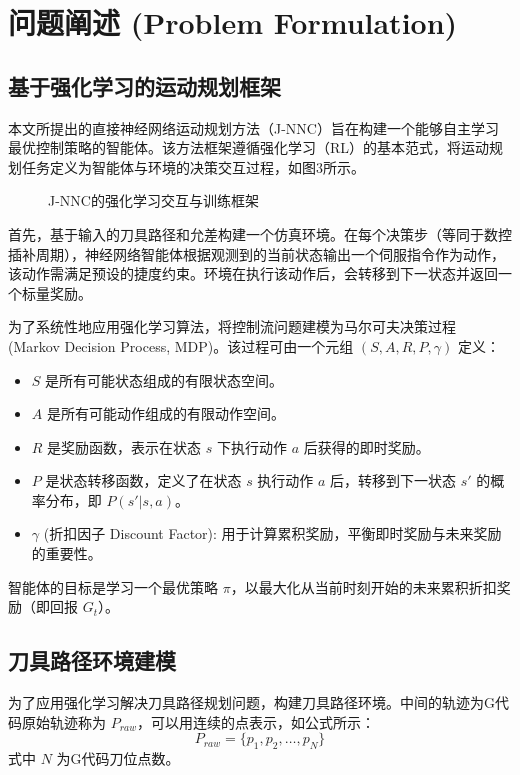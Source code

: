 \documentclass[preprint,12pt]{elsarticle}
\begin{document}
\section{问题阐述 (Problem Formulation)}
\label{sec:formulation}

\subsection{基于强化学习的运动规划框架}
本文所提出的直接神经网络运动规划方法（J-NNC）旨在构建一个能够自主学习最优控制策略的智能体。该方法框架遵循强化学习（RL）的基本范式，将运动规划任务定义为智能体与环境的决策交互过程，如图3所示。

\begin{figure}[htbp]
    \centering
    \caption{J-NNC的强化学习交互与训练框架}
    \label{fig:rl_framework}
\end{figure}

首先，基于输入的刀具路径和允差构建一个仿真环境。在每个决策步（等同于数控插补周期），神经网络智能体根据观测到的当前状态输出一个伺服指令作为动作，该动作需满足预设的捷度约束。环境在执行该动作后，会转移到下一状态并返回一个标量奖励。

为了系统性地应用强化学习算法，将控制流问题建模为马尔可夫决策过程 (Markov Decision Process, MDP)。该过程可由一个元组 $(S, A, R, P, \gamma)$ 定义：
\begin{itemize}
    \item $S$ 是所有可能状态组成的有限状态空间。
    \item $A$ 是所有可能动作组成的有限动作空间。
    \item $R$ 是奖励函数，表示在状态 $s$ 下执行动作 $a$ 后获得的即时奖励。
    \item $P$ 是状态转移函数，定义了在状态 $s$ 执行动作 $a$ 后，转移到下一状态 $s'$ 的概率分布，即 $P(s'|s,a)$。
    \item $\gamma$ (折扣因子 Discount Factor): 用于计算累积奖励，平衡即时奖励与未来奖励的重要性。
\end{itemize}

智能体的目标是学习一个最优策略 $\pi$，以最大化从当前时刻开始的未来累积折扣奖励（即回报 $G_t$）。

\subsection{刀具路径环境建模}
为了应用强化学习解决刀具路径规划问题，构建刀具路径环境。中间的轨迹为G代码原始轨迹称为 $P_{raw}$，可以用连续的点表示，如公式所示：
\begin{equation}
    P_{raw} = \{p_1, p_2, \dots, p_N\}
\end{equation}
式中 $N$ 为G代码刀位点数。
\end{document}
